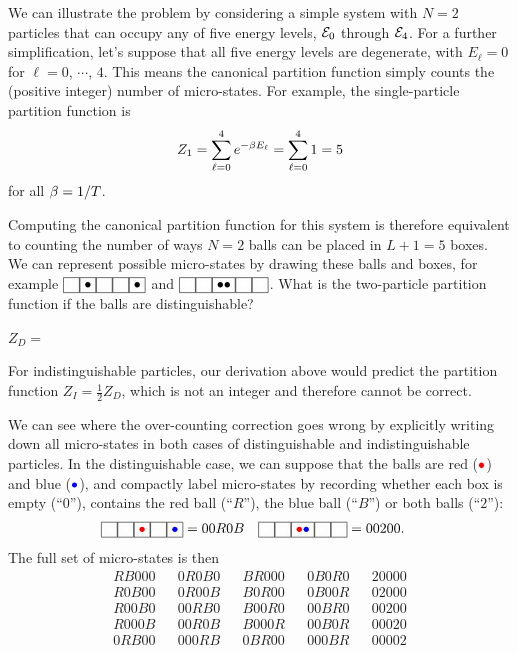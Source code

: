 We can illustrate the problem by considering a simple system with $N = 2$ particles that can occupy any of five energy levels, $\mathcal E_0$ through $\mathcal E_4$.
For a further simplification, let's suppose that all five energy levels are degenerate, with $E_{\ell} = 0$ for $\ell = 0$, $\cdots$, $4$.
This means the canonical partition function simply counts the (positive integer) number of micro-states.
For example, the single-particle partition function is
\begin{equation*}
  Z_1 = \sum_{\ell = 0}^4 e^{-\beta E_{\ell}} = \sum_{\ell = 0}^4 1 = 5
\end{equation*}
for all $\beta = 1 / T$.

Computing the canonical partition function for this system is therefore equivalent to counting the number of ways $N = 2$ balls can be placed in $L + 1 = 5$ boxes.
We can represent possible micro-states by drawing these balls and boxes, for example $\boxzero\boxone\boxzero\boxzero\boxone$ and $\boxzero\boxzero\boxtwo\boxzero\boxzero$.
What is the two-particle partition function if the balls are distinguishable?
\begin{mdframed}
  $Z_D = $ \\[24 pt]
\end{mdframed}
For indistinguishable particles, our derivation above would predict the partition function $Z_I = \frac{1}{2} Z_D$, which is not an integer and therefore cannot be correct.

We can see where the over-counting correction goes wrong by explicitly writing down all micro-states in both cases of distinguishable and indistinguishable particles.
In the distinguishable case, we can suppose that the balls are red ($\textcolor{red}{\bullet}$) and blue ($\textcolor{blue}{\bullet}$), and compactly label micro-states by recording whether each box is empty (``$0$''), contains the red ball (``$R$''), the blue ball (``$B$'') or both balls (``$2$''):
\begin{align*}
  \boxzero\boxzero\boxed{\textcolor{red}{\bullet}}\boxzero\boxed{\textcolor{blue}{\bullet}} & = 00R0B &
  \boxzero\boxzero\boxed{\textcolor{red}{\bullet}\textcolor{blue}{\bullet}}\boxzero\boxzero & = 00200.
\end{align*}
The full set of micro-states is then
\begin{align*}
  RB000 & & 0R0B0 & & BR000 & & 0B0R0 & & 20000 \\
  R0B00 & & 0R00B & & B0R00 & & 0B00R & & 02000 \\
  R00B0 & & 00RB0 & & B00R0 & & 00BR0 & & 00200 \\
  R000B & & 00R0B & & B000R & & 00B0R & & 00020 \\
  0RB00 & & 000RB & & 0BR00 & & 000BR & & 00002
\end{align*}

